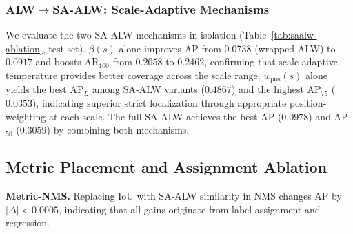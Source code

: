 \subsubsection{ALW$\to$SA-ALW: Scale-Adaptive Mechanisms}

We evaluate the two SA-ALW mechanisms in isolation (Table~\ref{tab:saalw-ablation},
test set). $\beta(s)$ alone improves AP from $0.0738$ (wrapped ALW) to
$0.0917$ and boosts AR$_{100}$ from $0.2058$ to $0.2462$, confirming that
scale-adaptive temperature provides better coverage across the scale range.
$w_{\text{pos}}(s)$ alone yields the best AP$_{L}$ among SA-ALW variants
($0.4867$) and the highest AP$_{75}$ ($0.0353$), indicating superior
strict localization through appropriate position-weighting at each scale.
The full SA-ALW achieves the best AP ($0.0978$) and AP$_{50}$ ($0.3059$)
by combining both mechanisms.

\begin{table}[t]
\centering
\caption{ALW$\to$SA-ALW mechanism ablation (test, seed~42).}
\label{tab:saalw-ablation}
\scriptsize
{}
\end{table}

\subsection{Metric Placement and Assignment Ablation}
\label{sec:exp-placement}

\textbf{Metric-NMS.} Replacing IoU with SA-ALW similarity in NMS changes
AP by $|\Delta|<0.0005$, indicating that all gains originate from label
assignment and regression.

